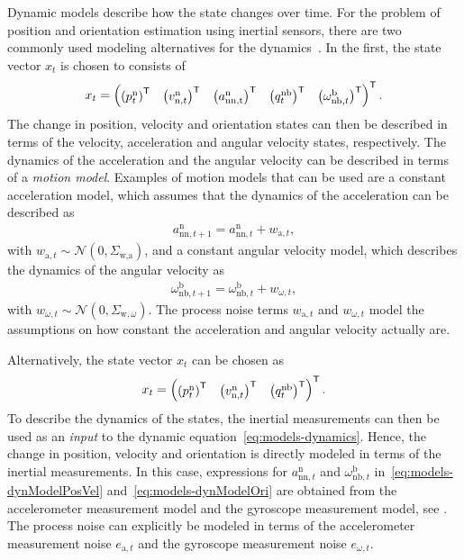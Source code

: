 Dynamic models describe how the state changes over time. For the problem of position and orientation estimation using inertial sensors, there are two commonly used modeling alternatives for the dynamics~\citep{gustafsson:2012}. In the first, the state vector $x_t$ is chosen to consists of  
\begin{align}
x_t = \begin{pmatrix} \left(p^\text{n}_t \right)^{\mathsf{T}} & \left(v^\text{n}_{\text{n},t} \right)^{\mathsf{T}} & \left(a^\text{n}_{\text{nn,t}} \right)^{\mathsf{T}} & \left(q^\text{nb}_t \right)^{\mathsf{T}} & \left(\omega^\text{b}_{\text{nb},t} \right)^{\mathsf{T}} \end{pmatrix}^{\mathsf{T}}.
\end{align}
The change in position, velocity and orientation states can then be described in terms of the velocity, acceleration and angular velocity states, respectively. The dynamics of the acceleration and the angular velocity can be described in terms of a \emph{motion model}. Examples of motion models that can be used are a constant acceleration model, which assumes that the dynamics of the acceleration can be described as 
\begin{align}
\label{eq:models-constAcc}
a^\text{n}_{\text{nn},t+1} = a^\text{n}_{\text{nn},t} + w_{\text{a},t},
\end{align}
with $w_{\text{a},t} \sim \mathcal{N}(0,\Sigma_\text{w,a} )$, and a constant angular velocity model, which describes the dynamics of the angular velocity as
\begin{align}
\label{eq:models-constAngVel}
\omega^\text{b}_{\text{nb},t+1} = \omega^\text{b}_{\text{nb},t} + w_{\omega,t},
\end{align}
with $w_{\omega,t} \sim \mathcal{N}(0,\Sigma_{\text{w},\omega})$. The process noise terms $w_{\text{a},t}$ and $w_{\omega,t}$ model the assumptions on how constant the acceleration and angular velocity actually are. 

Alternatively, the state vector $x_t$ can be chosen as 
\begin{align}
x_t = \begin{pmatrix} \left(p^\text{n}_t \right)^{\mathsf{T}} & \left(v^\text{n}_{\text{n},t} \right)^{\mathsf{T}} & \left(q^\text{nb}_t \right)^{\mathsf{T}} \end{pmatrix}^{\mathsf{T}}.
\end{align}
To describe the dynamics of the states, the inertial measurements can then be used as an \emph{input} to the dynamic equation~\eqref{eq:models-dynamics}. Hence, the change in position, velocity and orientation is directly modeled in terms of the inertial measurements. In this case, expressions for $a^\text{n}_{\text{nn},t}$ and $\omega^\text{b}_{\text{nb},t}$ in~\eqref{eq:models-dynModelPosVel} and~\eqref{eq:models-dynModelOri} are obtained from the accelerometer measurement model and the gyroscope measurement model, see . The process noise can explicitly be modeled in terms of the accelerometer measurement noise $e_{\text{a},t}$ and the gyroscope measurement noise $e_{\omega,t}$. 


